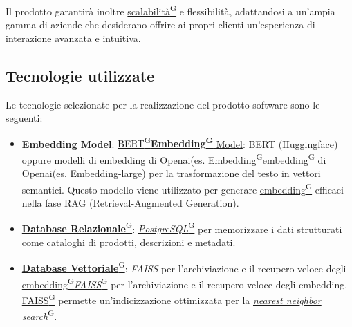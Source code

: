 Il prodotto garantirà inoltre \href{https://code7crusaders.github.io/docs/RTB/documentazione_interna/glossario.html#scalabilità}{scalabilità\textsuperscript{G}} e flessibilità, adattandosi a un’ampia gamma di aziende che desiderano offrire ai propri clienti un’esperienza di interazione avanzata e intuitiva.


\subsection{Tecnologie utilizzate}
Le tecnologie selezionate per la realizzazione del prodotto software sono le seguenti:

\begin{itemize}

    \item \textbf{Embedding Model}: \href{https://code7crusaders.github.io/docs/RTB/documentazione_interna/glossario.html#bert-bidirectional-encoder-representations-from-transformers}{BERT\textsuperscript{G}}\href{https://code7crusaders.github.io/docs/RTB/documentazione_interna/glossario.html#embedding}{\textbf{Embedding\textsuperscript{G}} Model}: BERT (Huggingface) oppure modelli di embedding di Openai(es. \href{https://code7crusaders.github.io/docs/RTB/documentazione_interna/glossario.html#embedding}{Embedding\textsuperscript{G}}\href{https://code7crusaders.github.io/docs/RTB/documentazione_interna/glossario.html#embedding}{embedding\textsuperscript{G}} di Openai(es. Embedding-large) per la trasformazione del testo in vettori semantici. Questo modello viene utilizzato per generare \href{https://code7crusaders.github.io/docs/RTB/documentazione_interna/glossario.html#embedding}{embedding\textsuperscript{G}} efficaci nella fase RAG (Retrieval-Augmented Generation).
    \item \href{https://code7crusaders.github.io/docs/RTB/documentazione_interna/glossario.html#database-relazionale}{\textbf{Database Relazionale}\textsuperscript{G}}: \href{https://code7crusaders.github.io/docs/RTB/documentazione_interna/glossario.html#postgresql}{\textit{PostgreSQL}\textsuperscript{G}} per memorizzare i dati strutturati come cataloghi di prodotti, descrizioni e metadati.
    \item \href{https://code7crusaders.github.io/docs/RTB/documentazione_interna/glossario.html#database-vettoriale}{\textbf{Database Vettoriale}\textsuperscript{G}}: \textit{FAISS} per l'archiviazione e il recupero veloce degli \href{https://code7crusaders.github.io/docs/RTB/documentazione_interna/glossario.html#embedding}{embedding\textsuperscript{G}}\href{https://code7crusaders.github.io/docs/RTB/documentazione_interna/glossario.html#faiss}{\textit{FAISS}\textsuperscript{G}} per l'archiviazione e il recupero veloce degli embedding. \href{https://code7crusaders.github.io/docs/RTB/documentazione_interna/glossario.html#faiss}{FAISS\textsuperscript{G}} permette un'indicizzazione ottimizzata per la \href{https://code7crusaders.github.io/docs/RTB/documentazione_interna/glossario.html#nearest-neighbor-search-nns}{\textit{nearest neighbor search}\textsuperscript{G}}.

\end{itemize}
